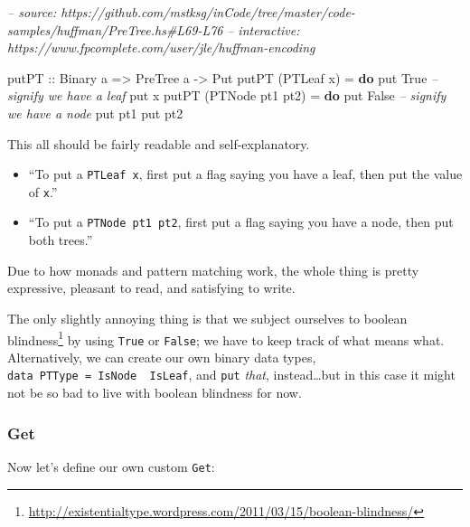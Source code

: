 \documentclass[]{article}
\newenvironment{Shaded}{}{}
\newcommand{\CommentTok}[1]{\textcolor[rgb]{0.38,0.63,0.69}{\textit{#1}}}
\newcommand{\DataTypeTok}[1]{\textcolor[rgb]{0.56,0.13,0.00}{#1}}
\newcommand{\FunctionTok}[1]{\textcolor[rgb]{0.02,0.16,0.49}{#1}}
\newcommand{\KeywordTok}[1]{\textcolor[rgb]{0.00,0.44,0.13}{\textbf{#1}}}
\newcommand{\NormalTok}[1]{#1}
\newcommand{\OtherTok}[1]{\textcolor[rgb]{0.00,0.44,0.13}{#1}}
\renewcommand{\href}[2]{#2\footnote{\url{#1}}}
\begin{document}
\begin{Shaded}
\begin{Highlighting}[]
\CommentTok{-- source: https://github.com/mstksg/inCode/tree/master/code-samples/huffman/PreTree.hs#L69-L76}
\CommentTok{-- interactive: https://www.fpcomplete.com/user/jle/huffman-encoding}

\OtherTok{putPT ::} \DataTypeTok{Binary}\NormalTok{ a }\OtherTok{=>} \DataTypeTok{PreTree}\NormalTok{ a }\OtherTok{->} \DataTypeTok{Put}
\NormalTok{putPT (}\DataTypeTok{PTLeaf}\NormalTok{ x) }\FunctionTok{=} \KeywordTok{do}
\NormalTok{    put }\DataTypeTok{True}                    \CommentTok{-- signify we have a leaf}
\NormalTok{    put x}
\NormalTok{putPT (}\DataTypeTok{PTNode}\NormalTok{ pt1 pt2) }\FunctionTok{=} \KeywordTok{do}
\NormalTok{    put }\DataTypeTok{False}                   \CommentTok{-- signify we have a node}
\NormalTok{    put pt1}
\NormalTok{    put pt2}
\end{Highlighting}
\end{Shaded}

This all should be fairly readable and self-explanatory.

\begin{itemize}
\item
  ``To put a \texttt{PTLeaf\ x}, first put a flag saying you have a leaf, then
  put the value of \texttt{x}.''
\item
  ``To put a \texttt{PTNode\ pt1\ pt2}, first put a flag saying you have a node,
  then put both trees.''
\end{itemize}

Due to how monads and pattern matching work, the whole thing is pretty
expressive, pleasant to read, and satisfying to write.

The only slightly annoying thing is that we subject ourselves to
\href{http://existentialtype.wordpress.com/2011/03/15/boolean-blindness/}{boolean
blindness} by using \texttt{True} or \texttt{False}; we have to keep track of
what means what. Alternatively, we can create our own binary data types,
\texttt{data\ PTType\ =\ IsNode\ \textbar{}\ IsLeaf}, and \texttt{put}
\emph{that}, instead\ldots{}but in this case it might not be so bad to live with
boolean blindness for now.

\hypertarget{get}{%
\subsubsection{Get}\label{get}}

Now let's define our own custom \texttt{Get}:
\end{document}
